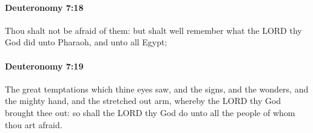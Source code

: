 		\paragraph{Deuteronomy 7:18} %
			\label{DEUTERONOMY-7-18}

			Thou shalt not be afraid of them: but shalt well remember what the LORD thy God did unto Pharaoh, and unto all Egypt;


		\paragraph{Deuteronomy 7:19} %
			\label{DEUTERONOMY-7-19}

			The great temptations which thine eyes saw, and the signs, and the wonders, and the mighty hand, and the stretched out arm, whereby the LORD thy God brought thee out: so shall the LORD thy God do unto all the people of whom thou art afraid.


